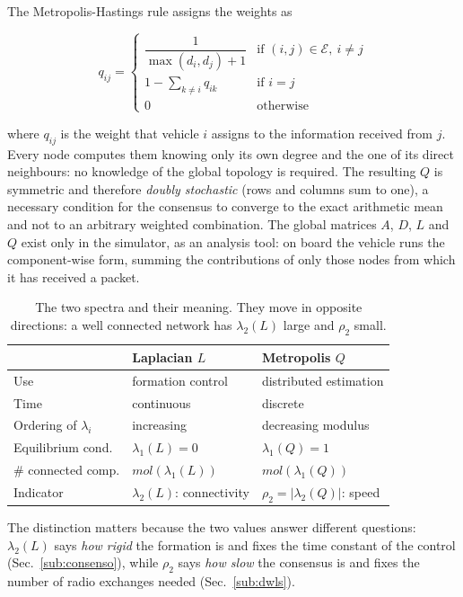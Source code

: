 \documentclass[conference,9pt]{IEEEtran}
\begin{document}
The Metropolis-Hastings rule \cite{xiao2004} assigns the weights as

\begin{equation}
q_{ij} =
\begin{cases}
\dfrac{1}{\max(d_i,d_j)+1} & \text{if } (i,j) \in \mathcal{E},\ i \neq j\\[1.5ex]
1 - \sum_{k \neq i} q_{ik} & \text{if } i = j\\[0.5ex]
0 & \text{otherwise}
\end{cases}
\label{eq:metropolis}
\end{equation}

where $q_{ij}$ is the weight that vehicle $i$ assigns to the information
received from $j$. Every node computes them knowing only its own degree and the
one of its direct neighbours: no knowledge of the global topology is required.
The resulting $Q$ is symmetric and therefore \emph{doubly stochastic} (rows and
columns sum to one), a necessary condition for the consensus to converge to the
exact arithmetic mean and not to an arbitrary weighted combination. The global
matrices $A$, $D$, $L$ and $Q$ exist only in the simulator, as an analysis
tool: on board the vehicle runs the component-wise form, summing the
contributions of only those nodes from which it has received a packet.

\begin{table}[t]
\centering
\caption{The two spectra and their meaning. They move in opposite directions: a
well connected network has $\lambda_2(L)$ large and $\rho_2$ small.}
\label{tab:spettri}
\begin{tabular}{lll}
\toprule
 & \textbf{Laplacian $L$} & \textbf{Metropolis $Q$}\\
\midrule
Use            & formation control    & distributed estimation\\
Time           & continuous           & discrete\\
Ordering of $\lambda_i$ & increasing  & decreasing modulus\\
Equilibrium cond. & $\lambda_1(L)=0$  & $\lambda_1(Q)=1$\\
\# connected comp. & $mol(\lambda_1(L))$   & $mol(\lambda_1(Q))$\\
Indicator      & $\lambda_2(L)$: connectivity & $\rho_2=|\lambda_2(Q)|$: speed\\
\bottomrule
\end{tabular}
\end{table}

The distinction matters because the two values answer different questions:
$\lambda_2(L)$ says \emph{how rigid} the formation is and fixes the time
constant of the control (Sec.~\ref{sub:consenso}), while $\rho_2$ says
\emph{how slow} the consensus is and fixes the number of radio exchanges needed
(Sec.~\ref{sub:dwls}).
\end{document}
